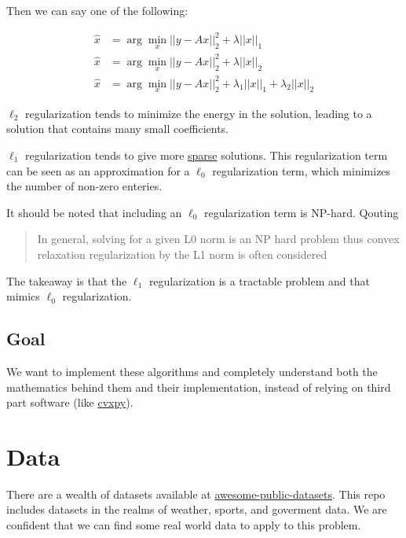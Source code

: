 \documentclass{article}
\newcommand{\cvxpy}{http://www.cvxpy.org/en/latest/}
\newcommand{\sparse}{https://en.wikipedia.org/wiki/Sparse_matrix}
\newcommand{\APD}{https://github.com/caesar0301/awesome-public-datasets}
\begin{document}
Then we can say one of the following:

$$\begin{aligned}
\widehat{x} &= \arg \min_x ||y - Ax||_2^2 + \lambda||x||_1\\
\widehat{x} &= \arg \min_x ||y - Ax||_2^2 + \lambda||x||_2\\
\widehat{x} &= \arg \min_x ||y - Ax||_2^2 + \lambda_1 ||x||_1 + \lambda_2||x||_2
\end{aligned}$$

$\ell_2$ regularization tends to minimize the energy in the solution, leading to a solution that contains many small coefficients.

$\ell_1$ regularization tends to give more \href{\sparse}{sparse} solutions. This regularization term can be seen as an approximation for a $\ell_0$ regularization term, which minimizes the number of non-zero enteries.

It should be noted that including an $\ell_0$ regularization term is NP-hard. Qouting \cite{Mørup_approximatel0}

\begin{quote}
In general, solving for a given L0 norm is an NP hard problem thus convex relaxation regularization by the L1 norm is often considered
\end{quote}

The takeaway is that the $\ell_1$ regularization is a tractable problem and that mimics $\ell_0$ regularization.

\subsection{Goal}
We want to implement these algorithms and completely understand both the mathematics behind them and their implementation, instead of relying on third part software (like \href{\cvxpy}{cvxpy}).

\section{Data}
There are a wealth of datasets available at \href{\APD}{awesome-public-datasets}. This repo includes datasets in the realms of weather, sports, and goverment data. We are confident that we can find some real world data to apply to this problem.




\end{document}
